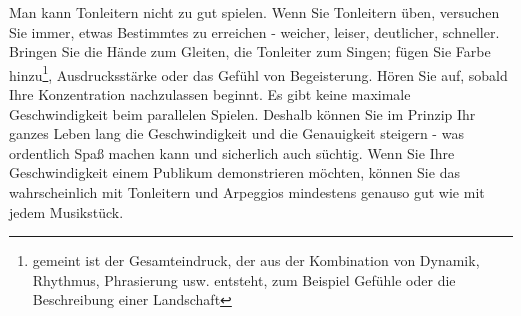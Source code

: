 Man kann Tonleitern nicht zu gut spielen.
Wenn Sie Tonleitern üben, versuchen Sie immer, etwas Bestimmtes zu erreichen - weicher, leiser, deutlicher, schneller.
Bringen Sie die Hände zum Gleiten, die Tonleiter zum Singen; fügen Sie Farbe hinzu\footnote{gemeint ist der Gesamteindruck, der aus der Kombination von Dynamik, Rhythmus, Phrasierung usw. entsteht, zum Beispiel Gefühle oder die Beschreibung einer Landschaft}, Ausdrucksstärke oder das Gefühl von  Begeisterung.
Hören Sie auf, sobald Ihre Konzentration nachzulassen beginnt.
Es gibt keine maximale Geschwindigkeit beim parallelen Spielen.
Deshalb können Sie im Prinzip Ihr ganzes Leben lang die Geschwindigkeit und die Genauigkeit steigern - was ordentlich Spaß machen kann und sicherlich auch süchtig.
Wenn Sie Ihre Geschwindigkeit einem Publikum demonstrieren möchten, können Sie das wahrscheinlich mit Tonleitern und Arpeggios mindestens genauso gut wie mit jedem Musikstück.



